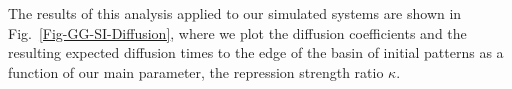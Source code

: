 \documentclass[10pt]{article}
\begin{document}
The results of this analysis applied to our simulated systems are shown in Fig.~\ref{Fig-GG-SI-Diffusion}, where we plot the diffusion coefficients and the resulting expected diffusion times to the edge of the basin of initial patterns as a function of our main parameter, the repression strength ratio $\kappa$.

\end{document}
